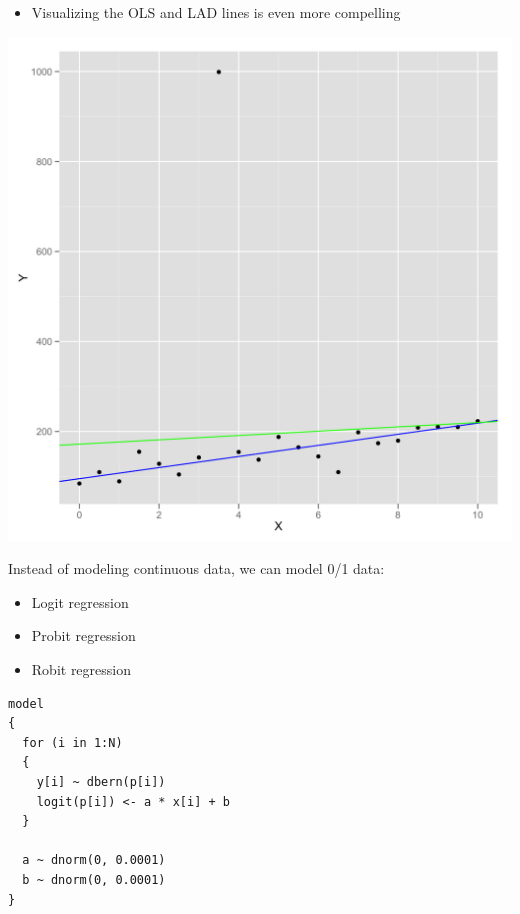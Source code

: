 \documentclass{beamer}
\begin{document}
\begin{frame}
  \begin{itemize}
    \item{Visualizing the OLS and LAD lines is even more compelling}
  \end{itemize}
\end{frame}

\begin{frame}[fragile]
  \begin{center}
    \includegraphics[scale = 0.1]{../graphs/lad/lad_vs_ols.png}
  \end{center}
\end{frame}

\begin{frame}[fragile]
  Instead of modeling continuous data, we can model 0/1 data:
  \begin{itemize}
    \item{Logit regression}
    \item{Probit regression}
    \item{Robit regression}
  \end{itemize}
\end{frame}

\begin{frame}[fragile]
  \begin{verbatim}
model
{
  for (i in 1:N)
  {
    y[i] ~ dbern(p[i])
    logit(p[i]) <- a * x[i] + b
  }
  
  a ~ dnorm(0, 0.0001)
  b ~ dnorm(0, 0.0001)
}
  \end{verbatim}
\end{frame}
\end{document}
